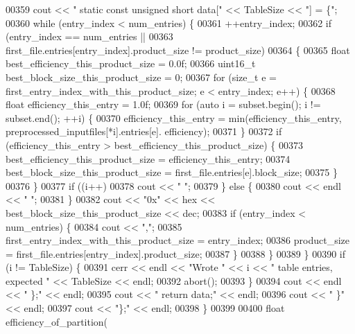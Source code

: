 \begin{DoxyCode}
{{00359   cout << \textcolor{stringliteral}{"    static const unsigned short data["} << TableSize << \textcolor{stringliteral}{"] = \{"};
00360   \textcolor{keywordflow}{while} (entry\_index < num\_entries) \{
00361     ++entry\_index;
00362     \textcolor{keywordflow}{if} (entry\_index == num\_entries ||
00363         first\_file.entries[entry\_index].product\_size != product\_size)
00364     \{
00365       \textcolor{keywordtype}{float} best\_efficiency\_this\_product\_size = 0.0f;
00366       uint16\_t best\_block\_size\_this\_product\_size = 0;
00367       \textcolor{keywordflow}{for} (\textcolor{keywordtype}{size\_t} e = first\_entry\_index\_with\_this\_product\_size; e < entry\_index; e++) \{
00368         \textcolor{keywordtype}{float} efficiency\_this\_entry = 1.0f;
00369         \textcolor{keywordflow}{for} (\textcolor{keyword}{auto} i = subset.begin(); i != subset.end(); ++i) \{
00370           efficiency\_this\_entry = min(efficiency\_this\_entry, preprocessed\_inputfiles[*i].entries[e].
      efficiency);
00371         \}
00372         \textcolor{keywordflow}{if} (efficiency\_this\_entry > best\_efficiency\_this\_product\_size) \{
00373           best\_efficiency\_this\_product\_size = efficiency\_this\_entry;
00374           best\_block\_size\_this\_product\_size = first\_file.entries[e].block\_size;
00375         \}
00376       \}
00377       \textcolor{keywordflow}{if} ((i++) %
00378         cout << \textcolor{stringliteral}{" "};
00379       \} \textcolor{keywordflow}{else} \{
00380         cout << endl << \textcolor{stringliteral}{"      "};
00381       \}
00382       cout << \textcolor{stringliteral}{"0x"} << hex << best\_block\_size\_this\_product\_size << dec;
00383       \textcolor{keywordflow}{if} (entry\_index < num\_entries) \{
00384         cout << \textcolor{stringliteral}{","};
00385         first\_entry\_index\_with\_this\_product\_size = entry\_index;
00386         product\_size = first\_file.entries[entry\_index].product\_size;
00387       \}
00388     \}
00389   \}
00390   \textcolor{keywordflow}{if} (i != TableSize) \{
00391     cerr << endl << \textcolor{stringliteral}{"Wrote "} << i << \textcolor{stringliteral}{" table entries, expected "} << TableSize << endl;
00392     abort();
00393   \}
00394   cout << endl << \textcolor{stringliteral}{"    \};"} << endl;
00395   cout << \textcolor{stringliteral}{"    return data;"} << endl;
00396   cout << \textcolor{stringliteral}{"  \}"} << endl;
00397   cout << \textcolor{stringliteral}{"\};"} << endl;
00398 \}
00399 
00400 \textcolor{keywordtype}{float} efficiency\_of\_partition(
}}
\end{DoxyCode}
